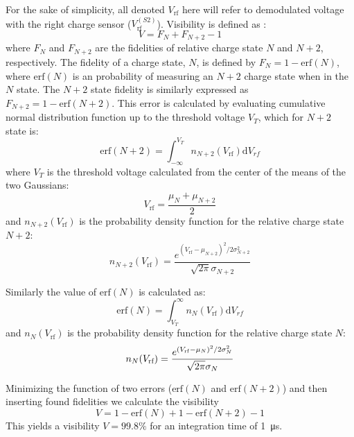 For the sake of simplicity, all denoted $V_\textrm{rf}$ here will refer to demodulated voltage with the right charge sensor ($V_\textrm{rf}^{(S2)}$). Visibility is defined as \cite{barthel2009rapid}:
\begin{equation}
  V = F_{N} + F_{N+2} - 1
\end{equation}
where $F_{N}$ and $F_{N+2}$ are the fidelities of relative charge state $N$ and $N+2$, respectively. The fidelity of a charge state, $N$, is defined by $F_{N} = 1 - \textrm{erf}(N)$, where $\textrm{erf}(N)$ is an probability of measuring an $N+2$ charge state when in the $N$ state. The $N+2$ state fidelity is similarly expressed as $F_{N+2} = 1 - \textrm{erf}(N+2)$. This error is calculated by evaluating cumulative normal distribution function up to the threshold voltage $V_T$, which for $N+2$ state is:
\begin{equation}
  \textrm{erf}(N+2) = \int_{-\infty}^{V_{T}}n_{N+2}(V_\textrm{rf})\textrm{d}V_{rf}
\end{equation}
where $V_{T}$ is the threshold voltage calculated from the center of the means of the two Gaussians:
\begin{equation}
  V_\textrm{rf} = \frac{\mu_{N}+\mu_{N+2}}{2}
\end{equation}
and $n_{N+2}(V_\textrm{rf})$ is the probability density function for the relative charge state $N+2$:
\begin{equation}
  n_{N+2}(V_\textrm{rf}) = \frac{e^{{(V_\textrm{rf} - \mu_{N+2})^2}/2\sigma_{N+2}^{2}}}{\sqrt{2\pi}\sigma_{N+2}}
\end{equation}

Similarly the value of $\textrm{erf}(N)$ is calculated as:
\begin{equation}
  \textrm{erf}(N) = \int_{V_{T}}^{\infty}n_{N}(V_\textrm{rf})\textrm{d}V_{rf}
\end{equation}
and $n_{N}(V_\textrm{rf})$ is the probability density function for the relative charge state $N$:
\begin{equation}
  n_{N}(V_\textrm{rf}) = \frac{e^{{(V_{\rm rf} - \mu_{N})^2}/2\sigma_{N}^{2}}}{\sqrt{2\pi}\sigma_{N}}
\end{equation}

Minimizing the function of two errors ($\textrm{erf}(N)$ and $\textrm{erf}(N+2)$) and then inserting found fidelities we calculate the visibility
\begin{equation}
  V = 1 - \textrm{erf}(N) + 1 - \textrm{erf}(N+2) - 1
\end{equation}
This yields a visibility $V = 99.8\%$ for an integration time of \SI{1}{\micro\second}.

